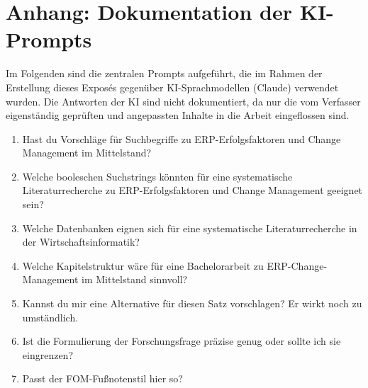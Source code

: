 \section*{Anhang: Dokumentation der KI-Prompts}

Im Folgenden sind die zentralen Prompts aufgeführt, die im Rahmen der Erstellung dieses Exposés gegenüber KI-Sprachmodellen (Claude) verwendet wurden. Die Antworten der KI sind nicht dokumentiert, da nur die vom Verfasser eigenständig geprüften und angepassten Inhalte in die Arbeit eingeflossen sind.

\begin{enumerate}
  \item \glqq{}Hast du Vorschläge für Suchbegriffe zu ERP-Erfolgsfaktoren und Change Management im Mittelstand?\grqq{}
  
  \item \glqq{}Welche booleschen Suchstrings könnten für eine systematische Literaturrecherche zu ERP-Erfolgsfaktoren und Change Management geeignet sein?\grqq{}
  
  \item \glqq{}Welche Datenbanken eignen sich für eine systematische Literaturrecherche in der Wirtschaftsinformatik?\grqq{}
  
  \item \glqq{}Welche Kapitelstruktur wäre für eine Bachelorarbeit zu ERP-Change-Management im Mittelstand sinnvoll?\grqq{}
  
  \item \glqq{}Kannst du mir eine Alternative für diesen Satz vorschlagen? Er wirkt noch zu umständlich.\grqq{}
  
  \item \glqq{}Ist die Formulierung der Forschungsfrage präzise genug oder sollte ich sie eingrenzen?\grqq{}
  
  \item \glqq{}Passt der FOM-Fußnotenstil hier so?\grqq{}
\end{enumerate}
\newpage
